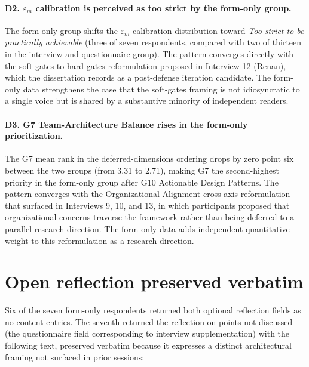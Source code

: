 \paragraph*{D2. $\varepsilon_m$ calibration is perceived as too strict by the form-only group.} The form-only group shifts the $\varepsilon_m$ calibration distribution toward \emph{Too strict to be practically achievable} (three of seven respondents, compared with two of thirteen in the interview-and-questionnaire group). The pattern converges directly with the soft-gates-to-hard-gates reformulation proposed in Interview 12 (Renan), which the dissertation records as a post-defense iteration candidate. The form-only data strengthens the case that the soft-gates framing is not idiosyncratic to a single voice but is shared by a substantive minority of independent readers.

\paragraph*{D3. G7 Team-Architecture Balance rises in the form-only prioritization.} The G7 mean rank in the deferred-dimensions ordering drops by zero point six between the two groups (from 3.31 to 2.71), making G7 the second-highest priority in the form-only group after G10 Actionable Design Patterns. The pattern converges with the Organizational Alignment cross-axis reformulation that surfaced in Interviews 9, 10, and 13, in which participants proposed that organizational concerns traverse the framework rather than being deferred to a parallel research direction. The form-only data adds independent quantitative weight to this reformulation as a research direction.

\section*{Open reflection preserved verbatim}

Six of the seven form-only respondents returned both optional reflection fields as no-content entries. The seventh returned the reflection on points not discussed (the questionnaire field corresponding to interview supplementation) with the following text, preserved verbatim because it expresses a distinct architectural framing not surfaced in prior sessions:

